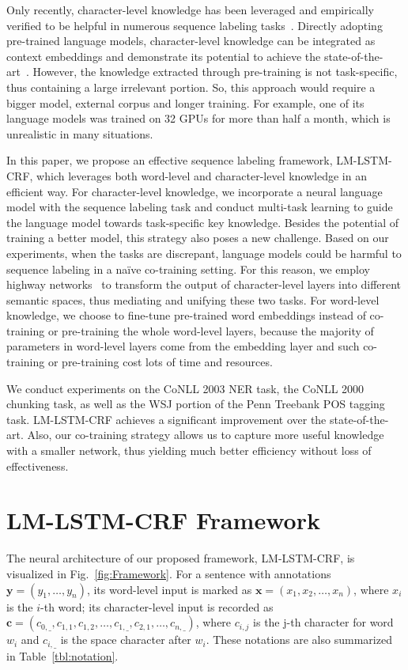 \documentclass[letterpaper]{article} \usepackage{aaai18}  \usepackage{times}  \usepackage{helvet}  \usepackage{courier}  \usepackage{url}  \usepackage{graphicx}  \usepackage{multirow}
\newcommand{\our}{\textsc{LM-LSTM-CRF}\xspace}
\def \myspace {\_}
\def \c {\mathbf{c}}
\def \x {\mathbf{x}}
\def \y {\mathbf{y}}
\begin{document}
Only recently, character-level knowledge has been leveraged and empirically verified to be helpful in numerous sequence labeling tasks~\cite{peters2017semi,rei2017semi}.
Directly adopting pre-trained language models, character-level knowledge can be integrated as context embeddings and demonstrate its potential to achieve the state-of-the-art~\cite{peters2017semi}.
However, the knowledge extracted through pre-training is not task-specific, thus containing a large irrelevant portion.
So,
this approach would require a bigger model, external corpus and longer training.
For example, one of its language models was trained on 32 GPUs for more than half a month, which is unrealistic in many situations.

In this paper, we propose an effective sequence labeling framework, \our, 
which leverages both word-level and character-level knowledge in an efficient way.
For character-level knowledge, we incorporate a neural language model with the sequence labeling task
and conduct multi-task learning to guide the language model towards task-specific key knowledge.
Besides the potential of training a better model, this strategy also poses a new challenge.
Based on our experiments, when the tasks are discrepant, language models could be harmful to sequence labeling in a na\"ive co-training setting.
For this reason, we employ highway networks~\cite{srivastava2015highway} to transform the output of character-level layers into different semantic spaces,
thus mediating and unifying these two tasks.
For word-level knowledge, we choose to fine-tune pre-trained word embeddings instead of co-training or pre-training the whole word-level layers,
because the majority of parameters in word-level layers come from the embedding layer and such co-training or pre-training cost lots of time and resources.

We conduct experiments on the CoNLL 2003 NER task, the CoNLL 2000 chunking task, as well as the WSJ portion of the Penn Treebank POS tagging task.
\our achieves a significant improvement over the state-of-the-art.
Also, our co-training strategy allows us to capture more useful knowledge with a smaller network, thus yielding much better efficiency without loss of effectiveness. 


\section{\our Framework}
\label{sect:model}

The neural architecture of our proposed framework, \our, is visualized in Fig.~\ref{fig:Framework}.
For a sentence with annotations $\y=(y_1, \dots, y_n )$, its word-level input is marked as $\x=(x_1, x_2, \dots, x_n)$, where $x_i$ is the $i$-th word; its character-level input is recorded as $\c=(c_{0,\myspace}, c_{1, 1}, c_{1, 2}, \dots, c_{1, \myspace}, c_{2, 1}, \dots, c_{n,\myspace})$, where $c_{i, j}$ is the j-th character for word $w_i$ and $c_{i, \myspace}$ is the space character after $w_i$.
These notations are also summarized in Table~\ref{tbl:notation}.
\end{document}

